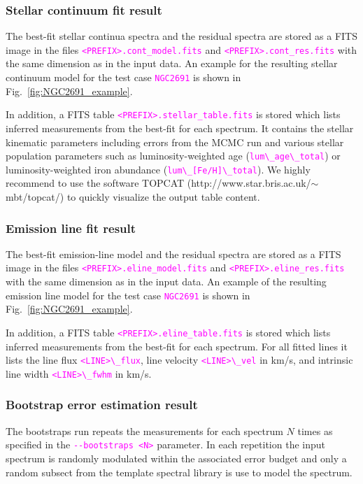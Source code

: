 \documentclass[usenatbib,usegraphicx,useAMS,onecolumn]{mn2e}
\newcommand{\codeline}[1]{\lstinline|#1|}
\newcommand{\fname}[1]{\textcolor{magenta}{\codeline{#1}}}
\begin{document}
\subsubsection{Stellar continuum fit result}
The best-fit stellar continua spectra and the residual spectra are stored as a FITS image in the files \fname{<PREFIX>.cont_model.fits} and \fname{<PREFIX>.cont_res.fits} with the same dimension as in the input data. An example for the resulting stellar continuum model for the test case \fname{NGC2691} is shown in Fig.~\ref{fig:NGC2691_example}. 

In addition, a FITS table \fname{<PREFIX>.stellar_table.fits} is stored which lists inferred measurements from the best-fit for each spectrum. It contains the stellar kinematic parameters including errors from the MCMC run and various stellar population parameters such as luminosity-weighted age (\fname{lum\_age\_total}) or luminosity-weighted iron abundance (\fname{lum\_[Fe/H]\_total}). We highly recommend to use the software \textsc{TOPCAT} (http://www.star.bris.ac.uk/$\sim$mbt/topcat/) to quickly visualize the output table content. 

\subsubsection{Emission line fit result}
The best-fit emission-line model and the residual spectra are stored as a FITS image in the files \fname{<PREFIX>.eline_model.fits} and \fname{<PREFIX>.eline_res.fits} with the same dimension as in the input data. An example of the resulting emission line model for the test case \fname{NGC2691} is shown in Fig.~\ref{fig:NGC2691_example}. 

In addition, a FITS table \fname{<PREFIX>.eline_table.fits} is stored which lists inferred measurements from the best-fit for each spectrum. For all fitted lines it lists the  line flux \fname{<LINE>\_flux}, line velocity \fname{<LINE>\_vel} in km/s, and intrinsic line width \fname{<LINE>\_fwhm} in km/s. 

\subsubsection{Bootstrap error estimation result}
The bootstraps run repeats the measurements for each spectrum $N$ times as specified in the \fname{--bootstraps <N>} parameter. In each repetition the input spectrum is randomly modulated within the associated error budget and only a random subsect from the template spectral library is use to model the spectrum.
\end{document}
